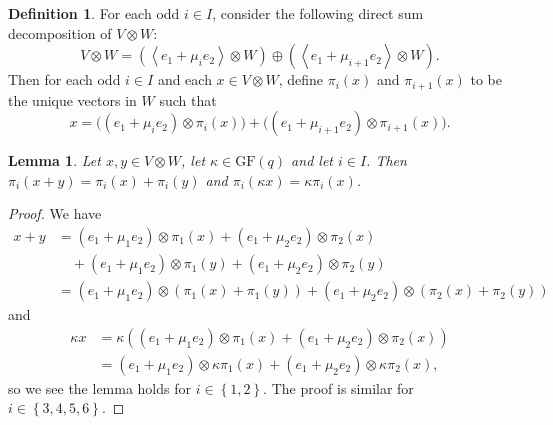 \documentclass[10pt]{amsart}
\theoremstyle{definition}
\newtheorem{defi}[defi]{Definition}
\theoremstyle{plain}
\newtheorem{lemma}[lemma]{Lemma}
\theoremstyle{plain}
\theoremstyle{plain}
\theoremstyle{plain}
\newcommand{\GF}{\mathrm{GF}}
\begin{document}
\begin{defi} \label{def:projection-coordinates}
For each odd $i \in I$, consider the following direct sum decomposition of $V \otimes W$:
\begin{displaymath}
    V \otimes W = \left(\left<e_1 + \mu_i e_2 \right> \otimes W \right) \oplus {\left(\left<e_1 + \mu_{i+1} e_2 \right> \otimes W \right)}.
\end{displaymath}
Then for each odd $i \in I$ and each $x \in V \otimes W$, define $\pi_i{\left(x \right)}$ and $\pi_{i+1}{\left(x \right)}$ to be the unique vectors in $W$ such that
\begin{displaymath}
    x = \Big({\left(e_1 + \mu_i e_2 \right)} \otimes \pi_i{\left(x \right)} \Big) + \Big({\left(e_1 + \mu_{i+1} e_2 \right)} \otimes \pi_{i+1}{\left(x \right)}\Big).
\end{displaymath}
\end{defi}

\begin{lemma} \label{lm:projections-preserve-addition-and-multiplication}
Let $x, y \in V \otimes W$, let $\kappa \in \GF{\left(q \right)}$ and let $i \in I$. Then $\pi_i{\left(x + y \right)} = \pi_i{\left(x \right)} + \pi_i{\left(y \right)}$ and $\pi_i{\left(\kappa x \right)} = \kappa \pi_i{\left(x \right)}$.
\end{lemma}
\begin{proof}
We have
\begin{align*}
    x + y &= \left(e_1 + \mu_1 e_2 \right) \otimes \pi_1{\left(x \right)} + \left(e_1 + \mu_2 e_2 \right) \otimes \pi_2{\left(x \right)} \\
    & \quad + \left(e_1 + \mu_1 e_2 \right) \otimes \pi_1{\left(y \right)} + \left(e_1 + \mu_2 e_2 \right) \otimes \pi_2{\left(y \right)} \\
    &= \left(e_1 + \mu_1 e_2 \right) \otimes \left(\pi_1{\left(x \right)} + \pi_1{\left(y \right)}\right) + \left(e_1 + \mu_2 e_2 \right) \otimes \left(\pi_2{\left(x \right)} + \pi_2{\left(y \right)}\right)
\end{align*}
and
\begin{align*}
    \kappa x &= \kappa \left(\left(e_1 + \mu_1 e_2 \right) \otimes \pi_1{\left(x \right)} + \left(e_1 + \mu_2 e_2 \right) \otimes \pi_2{\left(x \right)}\right) \\
    &= \left(e_1 + \mu_1 e_2 \right) \otimes \kappa \pi_1{\left(x \right)} + \left(e_1 + \mu_2 e_2 \right) \otimes \kappa \pi_2{\left(x \right)},
\end{align*}
so we see the lemma holds for $i \in \left\{1, 2 \right\}$. The proof is similar for $i \in \left\{3, 4, 5, 6 \right\}$.
\end{proof}
\end{document}
